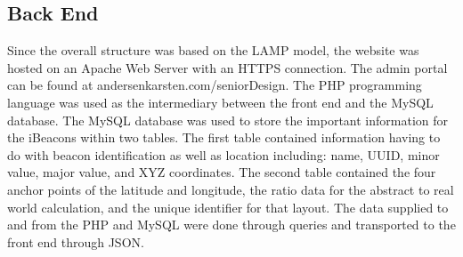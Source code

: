 \subsection{Back End}
Since the overall structure was based on the LAMP model, the website was hosted on an Apache Web Server with an HTTPS connection. The admin portal can be
found at andersenkarsten.com/seniorDesign. The PHP programming language was used as the intermediary between the front end and the MySQL database.
The MySQL database was used to store the important information for the iBeacons within two tables. The first table contained information having to do with beacon identification as well as location including:
name, UUID, minor value, major value, and XYZ coordinates. The second table contained the four anchor points of the latitude and longitude, the ratio data for the abstract to real world calculation, and the unique identifier for that layout.
The data supplied to and from the PHP and MySQL were done through queries and transported to the front end through JSON.
